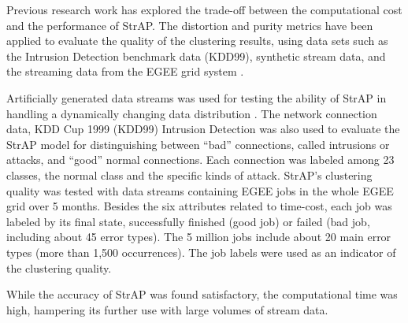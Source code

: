 Previous research work has explored the trade-off between the computational cost and the performance of StrAP. The distortion and purity metrics have been applied to evaluate the quality of the clustering results, using data sets such as the Intrusion Detection benchmark data (KDD99), synthetic stream data, and the streaming data from the EGEE grid system \cite{zhang2008data}.  

Artificially generated data streams was used for testing the ability of StrAP in handling a dynamically changing data distribution \cite{zhang2008data}. The network connection data, KDD Cup 1999 (KDD99) Intrusion Detection was also used to evaluate the StrAP model for distinguishing between “bad” connections, called intrusions or attacks, and “good” normal connections. Each connection was labeled among 23 classes, the normal class and the specific kinds of attack. StrAP's clustering quality was tested with data streams containing EGEE jobs in the whole EGEE grid over 5 months. Besides the six attributes related to time-cost, each job was labeled by its final state, successfully finished (good job) or failed (bad job, including about 45 error types). The 5 million jobs include about 20 main error types (more than 1,500 occurrences). The job labels were used as an indicator of the clustering quality.

While the accuracy of StrAP was found satisfactory, the computational time was high, hampering its further use with large volumes of stream data.






